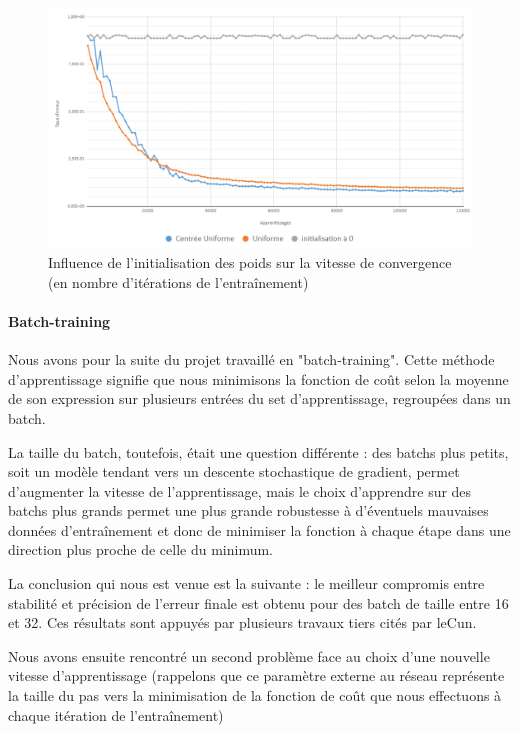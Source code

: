 \documentclass[
    10pt,
    a4paper,
    oneside,
    headinclude,footinclude,
    BCOR=5mm,
    captions=tableabove
]{scrartcl}
\begin{document}
\begin{figure}[h!]
\includegraphics[width=\linewidth]{initPoids.png}
\centering
\caption{Influence de l'initialisation des poids sur la vitesse de convergence (en nombre d'itérations de l'entraînement) }
\label{fig:initPoids.png}
\end{figure}

\paragraph{Batch-training}
Nous avons pour la suite du projet travaillé en "batch-training". Cette méthode d'apprentissage signifie que nous minimisons la fonction de coût selon la moyenne de son expression sur plusieurs entrées du set d'apprentissage, regroupées dans un batch.

La taille du batch, toutefois, était une question différente : des batchs plus petits, soit un modèle tendant vers un descente stochastique de gradient, permet d'augmenter la vitesse de l'apprentissage, mais le choix d'apprendre sur des batchs plus grands permet une plus grande robustesse à d'éventuels mauvaises données d'entraînement et donc de minimiser la fonction à chaque étape dans une direction plus proche de celle du minimum.

La conclusion qui nous est venue est la suivante : le meilleur compromis entre stabilité et précision de l'erreur finale est obtenu pour des batch de taille entre 16 et 32. Ces résultats sont appuyés par plusieurs travaux tiers cités par leCun. %

Nous avons ensuite rencontré un second problème face au choix d'une nouvelle vitesse d'apprentissage (rappelons que ce paramètre externe au réseau représente la taille du pas vers la minimisation de la fonction de coût que nous effectuons à chaque itération de l'entraînement)
\end{document}
